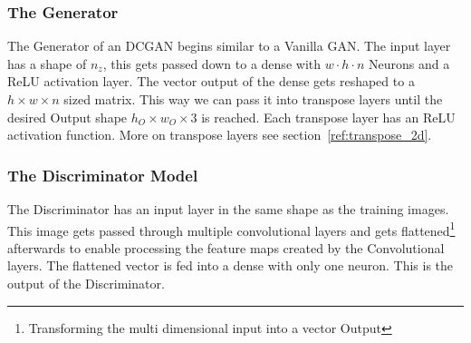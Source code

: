 \documentclass{article}
\begin{document}
\subsubsection{The Generator}
The Generator of an DCGAN begins similar to a Vanilla GAN. The input layer has a shape of $n_z$, this gets passed down to a \gls{dense} with $w\cdot h\cdot n$ Neurons and a ReLU activation layer. The vector output of the \gls{dense} gets reshaped to a $h \times w\times n$ sized matrix. This way we can pass it into transpose layers until the desired Output shape $h_O\times w_O\times 3$ is reached. Each transpose layer has an ReLU activation function. More on transpose layers see section~\ref{ref:transpose_2d}. 

\subsubsection{The Discriminator Model}
The Discriminator has an input layer in the same shape as the training images. This image gets passed through multiple convolutional layers and gets flattened\footnote{Transforming the multi dimensional input into a vector Output} afterwards to enable processing the feature maps created by the Convolutional layers. The flattened vector is fed into a \gls{dense} with only one neuron. This is the output of the Discriminator. 
\end{document}

